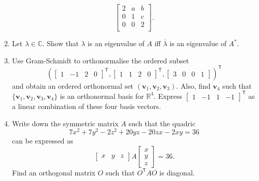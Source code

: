 \documentclass[12pt]{article}
\begin{document}
\begin{enumerate}[leftmargin=*]
	 \begin{equation*} 
	 	\begin{bmatrix}
	 		2 & a & b \\
	 		0 & 1 & c \\
	 		0 & 0 & 2 \\
	 	\end{bmatrix}.
	 \end{equation*}
	 \item Let $\lambda \in \mathbb{C}$. Show that $\lambda$ is an eigenvalue of $A$ iff $\overline{\lambda}$ is an eigenvalue of $A^{\ast}$. 
	 \item Use Gram-Schmidt to orthonormalise the ordered subset
	 \begin{equation*} 
	 	(\begin{bmatrix}
	 		1 & -1 & 2 & 0
	 	\end{bmatrix}^{\mathsf{T}},
	 	\begin{bmatrix}
	 		1 & 1 & 2 & 0
	 	\end{bmatrix}^{\mathsf{T}},
	 	\begin{bmatrix}
	 		3 & 0 & 0 & 1
	 	\end{bmatrix})^{\mathsf{T}}
	 \end{equation*}
	 and obtain an ordered orthonormal set $(\mathbf{v}_{1}, \mathbf{v}_{2}, \mathbf{v}_{3})$. Also, find $\mathbf{v}_{4}$ such that $\{\mathbf{v}_{1}, \mathbf{v}_{2}, \mathbf{v}_{3}, \mathbf{v}_{4}\}$ is an orthonormal basis for $\mathbb{R}^{4}$. \newline
	 Express $\begin{bmatrix}
	 		1 & -1 & 1 & -1
	 	\end{bmatrix}^{\mathsf{T}}$ as a linear combination of these four basis vectors.
	 \item Write down the symmetric matrix $A$ such that the quadric
	 \begin{equation*} 
	 	7x^{2} + 7y^{2} - 2z^{2} + 20yz - 20zx - 2xy = 36
	 \end{equation*}
	 can be expressed as
	 \begin{equation*} 
	 	\begin{bmatrix}
	 		x & y & z
	 	\end{bmatrix} A 
	 	\begin{bmatrix}
	 		x \\
	 		y \\
	 		z
	 	\end{bmatrix} = 36.
	 \end{equation*}
	 Find an orthogonal matrix $O$ such that $O^{\mathsf{T}}AO$ is diagonal.

\end{enumerate}
\end{document}
